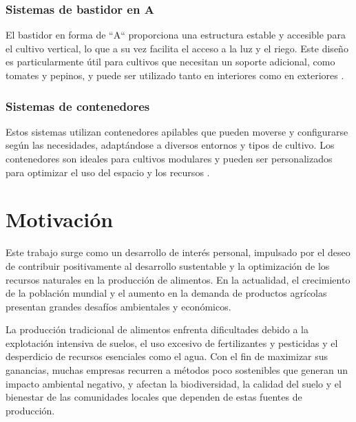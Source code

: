 \subsubsection{Sistemas de bastidor en A}
El bastidor en forma de ``A`` proporciona una estructura estable y accesible para el cultivo vertical, lo que a su vez facilita el acceso a la luz y el riego.
Este diseño es particularmente útil para cultivos que necesitan un soporte adicional, como tomates y pepinos, y puede ser utilizado tanto en interiores como en exteriores \cite{CULTIVOS:TIPOS}.

\subsubsection{Sistemas de contenedores}
Estos sistemas utilizan contenedores apilables que pueden moverse y configurarse según las necesidades, adaptándose a diversos entornos y tipos de cultivo.
Los contenedores son ideales para cultivos modulares y pueden ser personalizados para optimizar el uso del espacio y los recursos \cite{CULTIVOS:TIPOS}.



\section{Motivación}

Este trabajo surge como un desarrollo de interés personal, impulsado por el deseo de contribuir positivamente al desarrollo sustentable y la optimización de los recursos naturales en la producción de alimentos. En la actualidad, el crecimiento de la población mundial y el aumento en la demanda de productos agrícolas presentan grandes desafíos ambientales y económicos.

La producción tradicional de alimentos enfrenta dificultades debido a la explotación intensiva de suelos, el uso excesivo de fertilizantes y pesticidas y el desperdicio de recursos esenciales como el agua. Con el fin de maximizar sus ganancias, muchas empresas recurren a métodos poco sostenibles que generan un impacto ambiental negativo, y afectan la biodiversidad, la calidad del suelo y el bienestar de las comunidades locales que dependen de estas fuentes de producción.

